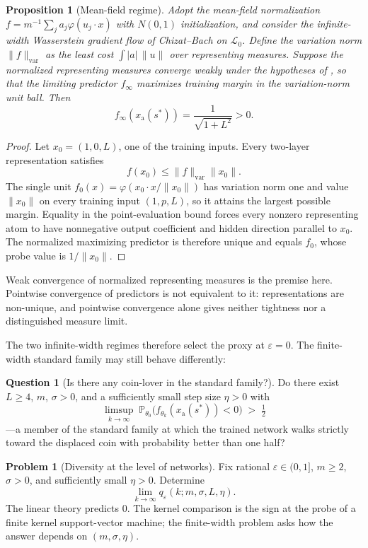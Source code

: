 \documentclass[11pt]{amsart}
\theoremstyle{plain}
\newtheorem{proposition}[theorem]{Proposition}
\theoremstyle{definition}
\newtheorem{problem}[theorem]{Problem}
\newtheorem{question}[theorem]{Question}
\begin{document}
\begin{proposition}[Mean-field regime]\label{prop:meanfield}
Adopt the mean-field normalization $f=m^{-1}\sum_j a_j\varphi(u_j\cdot x)$ with $N(0,1)$ initialization, and consider the infinite-width Wasserstein gradient flow of Chizat--Bach \cite{chizat2020} on $\mathcal L_0$. Define the \emph{variation norm} $\|f\|_{\mathrm{var}}$ as the least cost $\int|a|\,\|u\|$ over representing measures. Suppose the normalized representing measures converge weakly under the hypotheses of \cite{chizat2020}, so that the limiting predictor $f_\infty$ maximizes training margin in the variation-norm unit ball. Then
\[
f_\infty(x_{\mathrm a}(s^*))=\frac1{\sqrt{1+L^2}}>0.
\]
\end{proposition}

\begin{proof}
Let $x_0=(1,0,L)$, one of the training inputs. Every two-layer representation satisfies
\[
f(x_0)\le\|f\|_{\mathrm{var}}\|x_0\|.
\]
The single unit $f_0(x)=\varphi(x_0\cdot x/\|x_0\|)$ has variation norm one and value $\|x_0\|$ on every training input $(1,p,L)$, so it attains the largest possible margin. Equality in the point-evaluation bound forces every nonzero representing atom to have nonnegative output coefficient and hidden direction parallel to $x_0$. The normalized maximizing predictor is therefore unique and equals $f_0$, whose probe value is $1/\|x_0\|$.
\end{proof}

Weak convergence of normalized representing measures is the premise here. Pointwise convergence of predictors is not equivalent to it: representations are non-unique, and pointwise convergence alone gives neither tightness nor a distinguished measure limit.

The two infinite-width regimes therefore select the proxy at $\varepsilon=0$. The finite-width standard family may still behave differently:

\begin{question}[Is there any coin-lover in the standard family?]\label{q:coinlover}
Do there exist $L\ge4$, $m$, $\sigma>0$, and a sufficiently small step size $\eta>0$ with
\[
   \limsup_{k\to\infty}\;\mathbb P_{\theta_0}\bigl(f_{\theta_k}(x_{\mathrm a}(s^{*}))<0\bigr)\;>\;\tfrac12
\]
---a member of the standard family at which the trained network walks strictly toward the displaced coin with probability better than one half?
\end{question}

\begin{problem}[Diversity at the level of networks]\label{prob:diversitynets}
Fix rational $\varepsilon\in(0,1]$, $m\ge2$, $\sigma>0$, and sufficiently small $\eta>0$. Determine
\[
\lim_{k\to\infty}q_\varepsilon(k;m,\sigma,L,\eta).
\]
The linear theory predicts $0$. The kernel comparison is the sign at the probe of a finite kernel support-vector machine; the finite-width problem asks how the answer depends on $(m,\sigma,\eta)$.
\end{problem}
\end{document}
